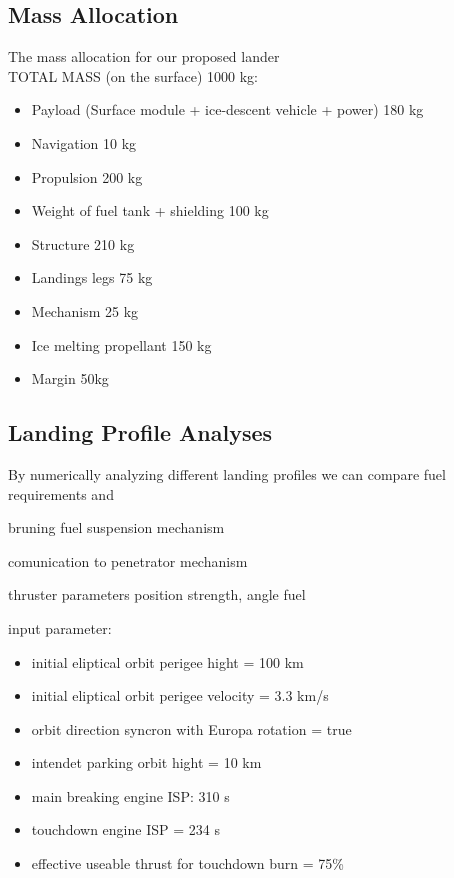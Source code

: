 \subsection{Mass Allocation}
The mass allocation for our proposed lander
\\
TOTAL MASS (on the surface) 1000 kg:
\begin{itemize}  
\item Payload (Surface module + ice-descent vehicle + power) 180 kg
\item Navigation 10 kg
\item Propulsion 200 kg
\item Weight of fuel tank + shielding 100 kg
\item Structure 210 kg
\item Landings legs 75 kg
\item Mechanism 25 kg
\item Ice melting propellant 150 kg
\item Margin 50kg
\end{itemize}




\subsection{Landing Profile Analyses}


By numerically analyzing different landing profiles we can compare fuel requirements and 


bruning fuel
suspension mechanism

comunication to penetrator mechanism   



thruster parameters position strength, angle fuel


input parameter:
\begin{itemize} 
\item initial eliptical orbit perigee hight = 100 km
\item initial eliptical orbit perigee velocity = 3.3 km/s
\item orbit direction syncron with Europa rotation = true
\item intendet parking orbit hight = 10 km
\item main breaking engine ISP: 310 s
\item touchdown engine ISP = 234 s
\item effective useable thrust for touchdown burn = 75\%
\end{itemize}


